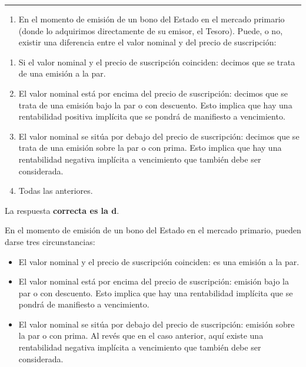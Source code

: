 \documentclass[
  letterpaper,
  DIV=11,
  numbers=noendperiod]{scrartcl}
\providecommand{\tightlist}{%
  \setlength{\itemsep}{0pt}\setlength{\parskip}{0pt}}\usepackage{longtable,booktabs,array}
\begin{document}
\begin{center}\rule{0.5\linewidth}{0.5pt}\end{center}

\begin{enumerate}
\def\labelenumi{\arabic{enumi}.}
\setcounter{enumi}{11}
\tightlist
\item
  En el momento de emisión de un bono del Estado en el mercado primario
  (donde lo adquirimos directamente de su emisor, el Tesoro). Puede, o
  no, existir una diferencia entre el valor nominal y del precio de
  suscripción:
\end{enumerate}

\begin{enumerate}
\def\labelenumi{\alph{enumi}.}
\item
  Si el valor nominal y el precio de suscripción coinciden: decimos que
  se trata de una emisión a la par.
\item
  El valor nominal está por encima del precio de suscripción: decimos
  que se trata de una emisión bajo la par o con descuento. Esto implica
  que hay una rentabilidad positiva implícita que se pondrá de
  manifiesto a vencimiento.
\item
  El valor nominal se sitúa por debajo del precio de suscripción:
  decimos que se trata de una emisión sobre la par o con prima. Esto
  implica que hay una rentabilidad negativa implícita a vencimiento que
  también debe ser considerada.
\item
  Todas las anteriores.
\end{enumerate}

\begin{tcolorbox}[enhanced jigsaw, colframe=quarto-callout-note-color-frame, opacityback=0, colback=white, leftrule=.75mm, left=2mm, breakable, arc=.35mm, rightrule=.15mm, toprule=.15mm, bottomrule=.15mm]
\begin{minipage}[t]{5.5mm}
\textcolor{quarto-callout-note-color}{\faInfo}
\end{minipage}%
\begin{minipage}[t]{\textwidth - 5.5mm}

La respuesta \textbf{correcta es la d}.

En el momento de emisión de un bono del Estado en el mercado primario,
pueden darse tres circunstancias:

\begin{itemize}
\item
  El valor nominal y el precio de suscripción coinciden: es una emisión
  a la par.
\item
  El valor nominal está por encima del precio de suscripción: emisión
  bajo la par o con descuento. Esto implica que hay una rentabilidad
  implícita que se pondrá de manifiesto a vencimiento.
\item
  El valor nominal se sitúa por debajo del precio de suscripción:
  emisión sobre la par o con prima. Al revés que en el caso anterior,
  aquí existe una rentabilidad negativa implícita a vencimiento que
  también debe ser considerada.
\end{itemize}

\end{minipage}%
\end{tcolorbox}
\end{document}
